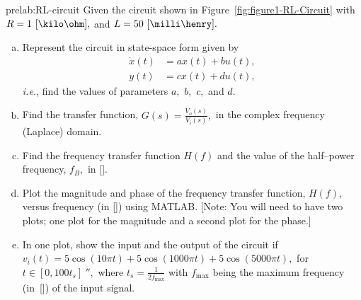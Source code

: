 \begin{prelab}{prelab:RL-circuit}
Given the circuit shown in Figure~\ref{fig:figure1-RL-Circuit} with $R = 1~[\kilo\ohm],$ and $L = 50~[\milli\henry].$ 
      \begin{enumerate}[(a)]
      \item  Represent the circuit in state-space form given by 
        \begin{align*}
          \dot x(t) &= a x(t) + bu(t),\\
          y(t) &= cx(t) + du(t),
        \end{align*}
        \textit{i.e.}, find the values of parameters $a,$ $b,$ $c,$ and $d.$ 
      \item Find the transfer function, $G(s) = \frac{V_o(s)}{V_i(s)},$ in the complex frequency (Laplace) domain.
        
      \item Find the frequency transfer function $H(f)$ and the value of the half--power frequency, $f_B,$ in [\hertz].
        
      \item Plot the magnitude and phase of the frequency transfer function, $H(f),$ versus frequency (in [\hertz]) using MATLAB. [Note: You will need to have two plots; one plot for the magnitude and a second plot for the phase.]
        
      \item  In one plot, show the input and the output of the circuit if $v_i(t) = 5\cos(10\pi t) + 5\cos(1000\pi t) +5\cos(5000\pi t),$ for $t\in[0,100t_s]~\second,$ where $t_s=\frac{1}{2f_{\mathrm{max}}}$ with $f_{\mathrm{max}}$ being the maximum frequency (in~[\hertz])  of the input signal.
        \end{enumerate}
\end{prelab}

